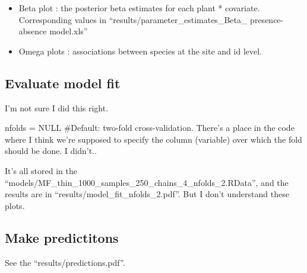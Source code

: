 \documentclass[
]{article}
\begin{document}
\begin{itemize}
\item
  Beta plot : the posterior beta estimates for each plant * covariate.
  Corresponding values in ``results/parameter\_estimates\_Beta\_
  presence-absence model.xls''
\item
  Omega plots : associations between species at the site and id level.
\end{itemize}

\hypertarget{evaluate-model-fit}{%
\subsection{Evaluate model fit}\label{evaluate-model-fit}}

I'm not sure I did this right.

nfolds = NULL \#Default: two-fold cross-validation. There's a place in
the code where I think we're supposed to specify the column (variable)
over which the fold should be done. I didn't..

It's all stored in the
``models/MF\_thin\_1000\_samples\_250\_chains\_4\_nfolds\_2.RData'', and
the results are in ``results/model\_fit\_nfolds\_2.pdf''. But I don't
understand these plots.

\hypertarget{make-predictitons}{%
\subsection{Make predictitons}\label{make-predictitons}}

See the ``results/predictions.pdf''.
\end{document}
